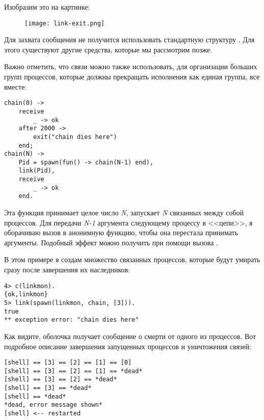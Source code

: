 Изобразим это на картинке:
\begin{figure}[h!]
    \centering
    \texttt{[image: link-exit.png]}
\end{figure}

Для захвата сообщения  не получится использовать стандартную структуру .
Для этого существуют другие средства, которые мы рассмотрим позже.

Важно отметить, что связи можно также использовать, для организации больших групп процессов, которые должны прекращать исполнения как единая группа, все вместе:
\begin{lstlisting}[style=erlang]
chain(0) ->
    receive
        _ -> ok
    after 2000 ->
        exit("chain dies here")
    end;
chain(N) ->
    Pid = spawn(fun() -> chain(N-1) end),
    link(Pid),
    receive
        _ -> ok
    end.
\end{lstlisting}

Эта функция принимает целое число \emph{N}, запускает \emph{N} связанных между собой процессов.
Для передачи \emph{N-1} аргумента следующему процессу в <<цепи>>, я оборачиваю вызов в анонимную функцию, чтобы она перестала принимать аргументы.
Подобный эффект можно получить при помощи вызова .

В этом примере я создам множество связанных процессов, которые будут умирать сразу после завершения их наследников:
\begin{lstlisting}[style=erlang]
4> c(linkmon).              
{ok,linkmon}
5> link(spawn(linkmon, chain, [3])).
true
** exception error: "chain dies here"
\end{lstlisting}

Как видите, оболочка получает сообщение о смерти от одного из процессов.
Вот подробное описание завершения запущенных процессов и уничтожения связей:
\begin{lstlisting}[style=erlang]
[shell] == [3] == [2] == [1] == [0]
[shell] == [3] == [2] == [1] == *dead*
[shell] == [3] == [2] == *dead*
[shell] == [3] == *dead*
[shell] == *dead*
*dead, error message shown*
[shell] <-- restarted
\end{lstlisting}

